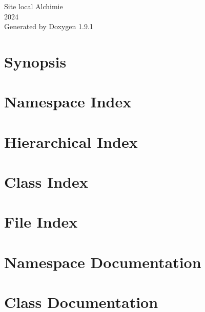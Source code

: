 \let\mypdfximage\pdfximage\def\pdfximage{\immediate\mypdfximage}\documentclass[twoside]{book}
\newcommand{\+}{\discretionary{\mbox{\scriptsize$\hookleftarrow$}}{}{}}
\newcommand{\clearemptydoublepage}{%
  \newpage{\pagestyle{empty}\cleardoublepage}%
}
\begin{document}
\raggedbottom

\begin{titlepage}
\vspace*{7cm}
\begin{center}%
{\Large Site local Alchimie \\[1ex]\large 2024 }\\
\vspace*{1cm}
{\large Generated by Doxygen 1.9.1}\\
\end{center}
\end{titlepage}
\clearemptydoublepage
{}
\tableofcontents
\clearemptydoublepage
{}

\chapter{Synopsis}
\label{md_main_README}

\chapter{Namespace Index}

\chapter{Hierarchical Index}

\chapter{Class Index}

\chapter{File Index}

\chapter{Namespace Documentation}



\chapter{Class Documentation}


\end{document}
